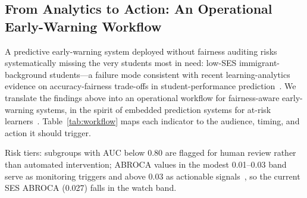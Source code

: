 \documentclass[journal]{IEEEtran}
\begin{document}
\subsection{From Analytics to Action: An Operational Early-Warning Workflow}
A predictive early-warning system deployed without fairness auditing risks systematically missing the very students most in need: low-SES immigrant-background students---a failure mode consistent with recent learning-analytics evidence on accuracy-fairness trade-offs in student-performance prediction~\cite{opoku2025fairness,cheng2025balancing}. We translate the findings above into an operational workflow for fairness-aware early-warning systems, in the spirit of embedded prediction systems for at-risk learners~\cite{baneres2023dropout}. Table~\ref{tab:workflow} maps each indicator to the audience, timing, and action it should trigger.

\begin{table}[!t]
\centering
\caption{Operational Indicator--Audience--Timing--Action Mapping for Fairness-Aware Early-Warning Systems}
\label{tab:workflow}
\footnotesize
{}
\vspace{2pt}
{\footnotesize Risk tiers: subgroups with AUC below 0.80 are flagged for human review rather than automated intervention; ABROCA values in the modest 0.01--0.03 band serve as monitoring triggers and above 0.03 as actionable signals~\cite{Gandara_2024_blackbox,Verger_2024_MADD}, so the current SES ABROCA (0.027) falls in the watch band.}
\end{table}
\end{document}
